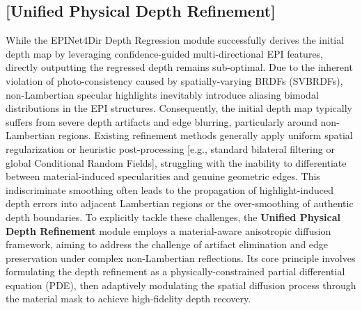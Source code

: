 \subsection{ [Unified Physical Depth Refinement]}

While the EPINet4Dir Depth Regression module successfully derives the initial depth map by leveraging confidence-guided multi-directional EPI features, directly outputting the regressed depth remains sub-optimal. Due to the inherent violation of photo-consistency caused by spatially-varying BRDFs (SVBRDFs), non-Lambertian specular highlights inevitably introduce aliasing bimodal distributions in the EPI structures. Consequently, the initial depth map typically suffers from severe depth artifacts and edge blurring, particularly around non-Lambertian regions. Existing refinement methods generally apply uniform spatial regularization or heuristic post-processing  [e.g., standard bilateral filtering or global Conditional Random Fields], struggling with the inability to differentiate between material-induced specularities and genuine geometric edges. This indiscriminate smoothing often leads to the propagation of highlight-induced depth errors into adjacent Lambertian regions or the over-smoothing of authentic depth boundaries. To explicitly tackle these challenges, the \textbf{Unified Physical Depth Refinement} module employs a material-aware anisotropic diffusion framework, aiming to address the challenge of artifact elimination and edge preservation under complex non-Lambertian reflections. Its core principle involves formulating the depth refinement as a physically-constrained partial differential equation (PDE), then adaptively modulating the spatial diffusion process through the material mask to achieve high-fidelity depth recovery.

